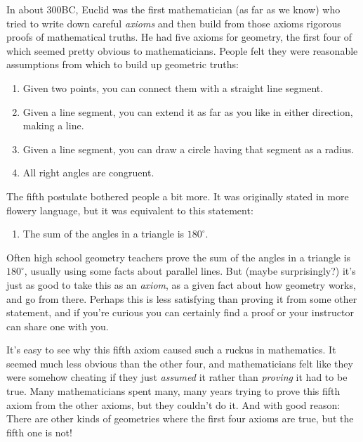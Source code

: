 \newpage

In about 300BC, Euclid was the first mathematician (as far as we know) who tried to write down careful \emph{axioms} and then build from those axioms rigorous proofs of mathematical truths.  He had five axioms for geometry, the first four of which seemed pretty obvious to mathematicians.  People felt they were reasonable assumptions from which to build up geometric truths:
\begin{enumerate}
\item
Given two points, you can connect them with a straight line segment.\\
\item
Given a line segment, you can extend it as far as you like in either direction, making a line.\\
\item
Given a line segment, you can draw a circle having that segment as a radius.\\
\item
All right angles are congruent.\\
\end{enumerate}
The fifth postulate bothered people a bit more. It was originally stated in more flowery language, but it was equivalent to this statement:

\begin{enumerate}
\addtocounter{enumi}{4}
\item
The sum of the angles in a triangle is $180^\circ$.\\
\end{enumerate}

Often high school geometry teachers prove the sum of the angles in a triangle is $180^\circ$, usually using some facts about parallel lines.  But (maybe surprisingly?) it's just as good to take this as an \emph{axiom}, as a given fact about how geometry works, and go from there.  Perhaps this is less satisfying than proving it from some other statement, and if you're curious you can certainly find a proof or your instructor can share one with you.


It's easy to see  why this fifth axiom caused such a ruckus in mathematics.  It seemed much less obvious than the other four, and mathematicians felt like they were somehow cheating if they just \emph{assumed} it rather than \emph{proving} it had to be true.  
Many mathematicians spent many, many years trying to prove this fifth axiom from the other axioms, but they couldn't do it.  And with good reason: There are other kinds of geometries where the first four axioms are true, but the fifth one is not!  

